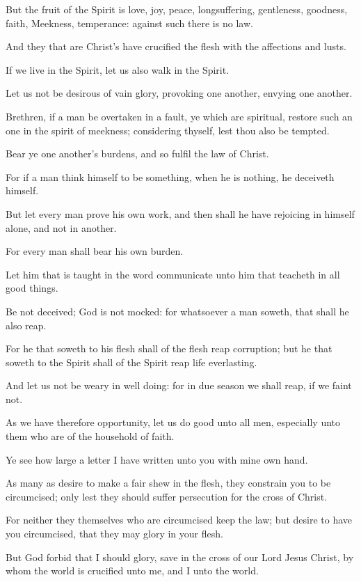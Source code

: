 \Verse But the fruit of the Spirit is love, joy, peace, longsuffering, gentleness, goodness, faith, \Verse Meekness, temperance: against such there is no law.

\Verse And they that are Christ's have crucified the flesh with the affections and lusts.

\Verse If we live in the Spirit, let us also walk in the Spirit.

\Verse Let us not be desirous of vain glory, provoking one another, envying one another.


\Chapter
\Verse Brethren, if a man be overtaken in a fault, ye which are spiritual, restore such an one in the spirit of meekness; considering thyself, lest thou also be tempted.

\Verse Bear ye one another's burdens, and so fulfil the law of Christ.

\Verse For if a man think himself to be something, when he is nothing, he deceiveth himself.

\Verse But let every man prove his own work, and then shall he have rejoicing in himself alone, and not in another.

\Verse For every man shall bear his own burden.

\Verse Let him that is taught in the word communicate unto him that teacheth in all good things.

\Verse Be not deceived; God is not mocked: for whatsoever a man soweth, that shall he also reap.

\Verse For he that soweth to his flesh shall of the flesh reap corruption; but he that soweth to the Spirit shall of the Spirit reap life everlasting.

\Verse And let us not be weary in well doing: for in due season we shall reap, if we faint not.

\Verse As we have therefore opportunity, let us do good unto all men, especially unto them who are of the household of faith.

\Verse Ye see how large a letter I have written unto you with mine own hand.

\Verse As many as desire to make a fair shew in the flesh, they constrain you to be circumcised; only lest they should suffer persecution for the cross of Christ.

\Verse For neither they themselves who are circumcised keep the law; but desire to have you circumcised, that they may glory in your flesh.

\Verse But God forbid that I should glory, save in the cross of our Lord Jesus Christ, by whom the world is crucified unto me, and I unto the world.

